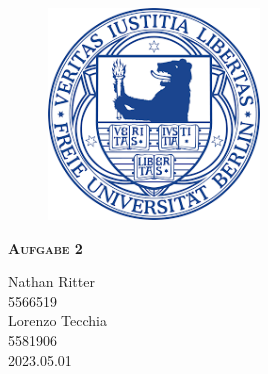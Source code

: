 \documentclass{report}
\begin{document}
\begin{center}
	
\end{center}
    \begin{figure}[htbp!]
        \begin{center}
            \includegraphics[width=0.5\textwidth]{Immagini/FUlogo.png}
        \end{center}
    \end{figure}
    
    {\centering\scshape\Large\bfseries Aufgabe 2
    \begin{center}
        Nathan Ritter  \\ 5566519 \\
        Lorenzo Tecchia \\ 5581906  \\ 2023.05.01
    \end{center}}


    \newpage
    
    \tableofcontents
    
    
    
    
\end{document}

